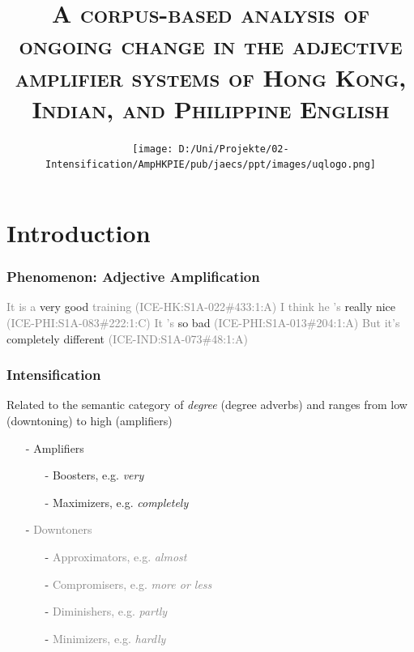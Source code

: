 \documentclass[12pt, table]{beamer}
\author{\color{uq}{\textsc{Dr. Martin Schweinberger \\
slides available at\\
\texttt{www.martinschweinberger.de}\\
\texttt{m.schweinberger@uq.edu.au}\\
\texttt{R} code upon request}}}
\title{\textsc{A corpus-based analysis of ongoing change in the adjective amplifier systems of Hong Kong, Indian, and Philippine English}\\}
\date{\texttt{[image: D:/Uni/Projekte/02-Intensification/AmpHKPIE/pub/jaecs/ppt/images/uqlogo.png]}}
\begin{document}
\begin{frame}[plain]
\titlepage 
\end{frame}

\section{Introduction}

\begin{frame}
\frametitle{Phenomenon: Adjective Amplification}
\begin{exe}
\ex \textcolor{gray}{It is a} \textcolor{uq}{very} good \textcolor{gray}{training (ICE-HK:S1A-022\#433:1:A)}
\ex \textcolor{gray}{I think he 's} \textcolor{uq}{really} nice \textcolor{gray}{(ICE-PHI:S1A-083\#222:1:C)}
\ex \textcolor{gray}{It 's} \textcolor{uq}{so} bad \textcolor{gray}{(ICE-PHI:S1A-013\#204:1:A)}
\ex \textcolor{gray}{But it's} \textcolor{uq}{completely} different \textcolor{gray}{(ICE-IND:S1A-073\#48:1:A)}
\end{exe}
\end{frame}



\begin{frame}
\frametitle{Intensification}
Related to the semantic category of \textit{degree} (degree adverbs) and ranges from low (downtoning) to high (amplifiers) \\
\begin{scriptsize}
\textcolor{gray}{\citep[589--590]{quirk1985comprehensive}}
\end{scriptsize}
\begin{itemize}
\item[-] Amplifiers
\begin{itemize}
\item[-] Boosters, e.g. \textit{very}
\item[-] Maximizers, e.g. \textit{completely}
\end{itemize}
\item[-] \textcolor{gray}{Downtoners}
\begin{itemize}
\item[-] \textcolor{gray}{Approximators, e.g. \textit{almost}}
\item[-] \textcolor{gray}{Compromisers, e.g. \textit{more or less}}
\item[-] \textcolor{gray}{Diminishers, e.g. \textit{partly}}
\item[-] \textcolor{gray}{Minimizers, e.g. \textit{hardly}}
\end{itemize} 
\end{itemize}
\end{frame}
\end{document}
